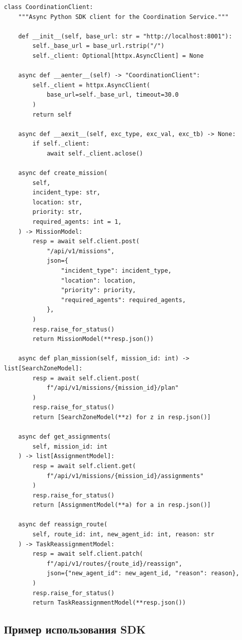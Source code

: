 \documentclass[12pt,a4paper]{article}
\begin{document}
\begin{lstlisting}[caption={client/coordination\_client.py (фрагмент)}]
class CoordinationClient:
    """Async Python SDK client for the Coordination Service."""

    def __init__(self, base_url: str = "http://localhost:8001"):
        self._base_url = base_url.rstrip("/")
        self._client: Optional[httpx.AsyncClient] = None

    async def __aenter__(self) -> "CoordinationClient":
        self._client = httpx.AsyncClient(
            base_url=self._base_url, timeout=30.0
        )
        return self

    async def __aexit__(self, exc_type, exc_val, exc_tb) -> None:
        if self._client:
            await self._client.aclose()

    async def create_mission(
        self,
        incident_type: str,
        location: str,
        priority: str,
        required_agents: int = 1,
    ) -> MissionModel:
        resp = await self.client.post(
            "/api/v1/missions",
            json={
                "incident_type": incident_type,
                "location": location,
                "priority": priority,
                "required_agents": required_agents,
            },
        )
        resp.raise_for_status()
        return MissionModel(**resp.json())

    async def plan_mission(self, mission_id: int) -> list[SearchZoneModel]:
        resp = await self.client.post(
            f"/api/v1/missions/{mission_id}/plan"
        )
        resp.raise_for_status()
        return [SearchZoneModel(**z) for z in resp.json()]

    async def get_assignments(
        self, mission_id: int
    ) -> list[AssignmentModel]:
        resp = await self.client.get(
            f"/api/v1/missions/{mission_id}/assignments"
        )
        resp.raise_for_status()
        return [AssignmentModel(**a) for a in resp.json()]

    async def reassign_route(
        self, route_id: int, new_agent_id: int, reason: str
    ) -> TaskReassignmentModel:
        resp = await self.client.patch(
            f"/api/v1/routes/{route_id}/reassign",
            json={"new_agent_id": new_agent_id, "reason": reason},
        )
        resp.raise_for_status()
        return TaskReassignmentModel(**resp.json())
\end{lstlisting}

\subsection{Пример использования SDK}
\end{document}
